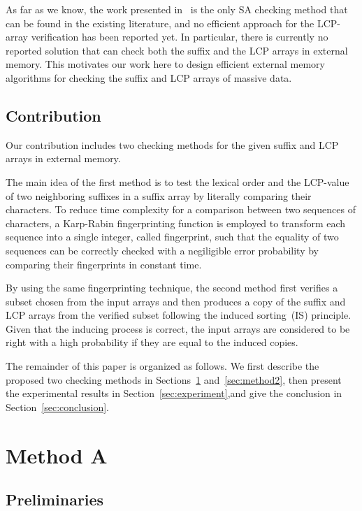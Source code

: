 \documentclass[10pt,journal,compsoc]{IEEEtran}
\begin{document}
As far as we know, the work presented in~\cite{Burkhardt2003} is the only SA checking method that can be found in the existing literature, and no efficient approach for the LCP-array verification has been reported yet. In particular, there is currently no reported solution that can check both the suffix and the LCP arrays in external memory. This motivates our work here to design efficient external memory algorithms for checking the suffix and LCP arrays of massive data.
	
\subsection{Contribution}\label{sec:introduction:contribution}

Our contribution includes two checking methods for the given suffix and LCP arrays in external memory. 

The main idea of the first method is to test the lexical order and the LCP-value of two neighboring suffixes in a suffix array by literally comparing their characters. To reduce time complexity for a comparison between two sequences of characters, a Karp-Rabin fingerprinting function is employed to transform each sequence into a single integer, called fingerprint, such that the equality of two sequences can be correctly checked with a negiligible error probability by comparing their fingerprints in constant time. 

By using the same fingerprinting technique, the second method first verifies a subset chosen from the input arrays and then produces a copy of the suffix and LCP arrays from the verified subset following the induced sorting~(IS) principle. Given that the inducing process is correct, the input arrays are considered to be right with a high probability if they are equal to the induced copies. 

The remainder of this paper is organized as follows. We first describe the proposed two checking methods in Sections~\ref{sec:method1} and~\ref{sec:method2}, then present the experimental results in Section~\ref{sec:experiment},and give the conclusion in Section~\ref{sec:conclusion}.


\section{Method A} \label{sec:method1}


\subsection{Preliminaries} \label{sec:method1:notations}
\end{document}
